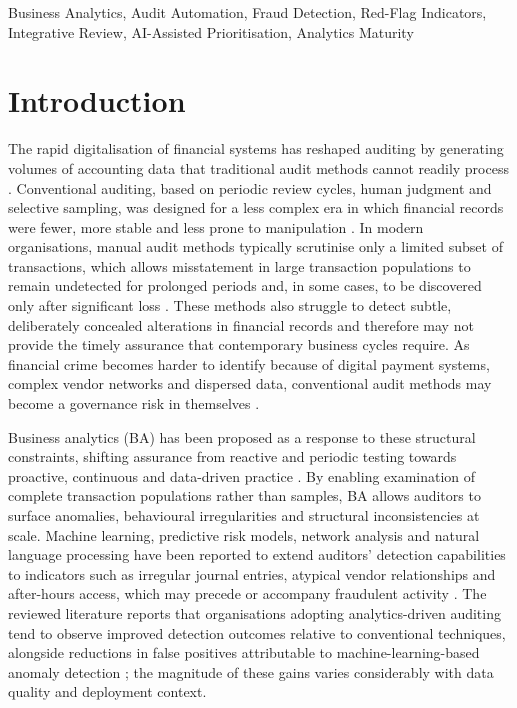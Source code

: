 \documentclass[conference]{IEEEtran}
\begin{document}
\begin{IEEEkeywords}
Business Analytics, Audit Automation, Fraud Detection, Red-Flag Indicators, Integrative Review, AI-Assisted Prioritisation, Analytics Maturity
\end{IEEEkeywords}

\section{Introduction}

The rapid digitalisation of financial systems has reshaped auditing by generating volumes of accounting data that traditional audit methods cannot readily process \cite{b1}. Conventional auditing, based on periodic review cycles, human judgment and selective sampling, was designed for a less complex era in which financial records were fewer, more stable and less prone to manipulation \cite{b2}. In modern organisations, manual audit methods typically scrutinise only a limited subset of transactions, which allows misstatement in large transaction populations to remain undetected for prolonged periods and, in some cases, to be discovered only after significant loss \cite{b3}. These methods also struggle to detect subtle, deliberately concealed alterations in financial records and therefore may not provide the timely assurance that contemporary business cycles require. As financial crime becomes harder to identify because of digital payment systems, complex vendor networks and dispersed data, conventional audit methods may become a governance risk in themselves \cite{b4,b5}.

Business analytics (BA) has been proposed as a response to these structural constraints, shifting assurance from reactive and periodic testing towards proactive, continuous and data-driven practice \cite{b6,b7}. By enabling examination of complete transaction populations rather than samples, BA allows auditors to surface anomalies, behavioural irregularities and structural inconsistencies at scale. Machine learning, predictive risk models, network analysis and natural language processing have been reported to extend auditors' detection capabilities to indicators such as irregular journal entries, atypical vendor relationships and after-hours access, which may precede or accompany fraudulent activity \cite{b8,b9,b10}. The reviewed literature reports that organisations adopting analytics-driven auditing tend to observe improved detection outcomes relative to conventional techniques, alongside reductions in false positives attributable to machine-learning-based anomaly detection \cite{b11,b4}; the magnitude of these gains varies considerably with data quality and deployment context.
\end{document}
